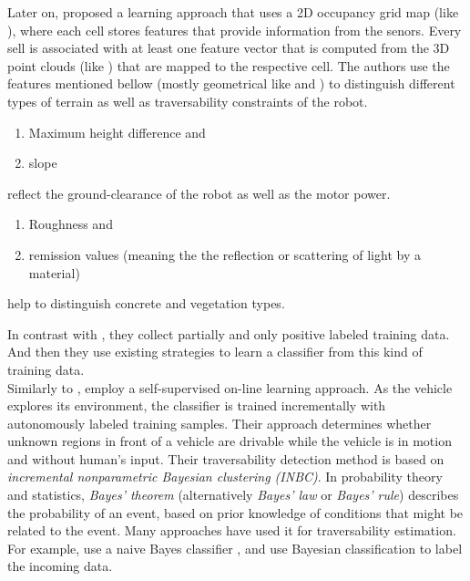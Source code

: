 \documentclass[12pt,a4paper]{report}
\newcommand{\term}{\textit}
\newcommand{\acronym}{\MakeUppercase}
\begin{document}
	Later on, \citet{Suger} proposed a learning approach that uses a \acronym{2d} 
	occupancy grid map (like \citet{Shneier}), where each cell stores features that 
	provide information from the senors. Every sell is associated with at least one 
	feature vector that is computed from the \acronym{3d} point clouds (like 
	\citet{Lalonde}) that are mapped to the respective cell. The authors use the 
	features mentioned bellow (mostly geometrical like \citet{Lalonde} and 
	\citet{Pfaff}) to distinguish different types of terrain as well as 
	traversability constraints of the robot. 
	\begin{enumerate}
		\item Maximum height difference and
		\item slope 
	\end{enumerate}
	reflect the ground-clearance of the robot as well as the motor power.
	\begin{enumerate}
		\item Roughness and
		\item remission values (meaning the the reflection or scattering 
		of light by a material) 
	\end{enumerate}
	help to distinguish concrete and vegetation types.
	\par
	In contrast with \citet{Kim}, they collect partially and only positive labeled 
	training data. And then they use existing strategies \citep{Denis, Elkan} to 
	learn a classifier from this kind of training data.
	\\
	
	Similarly to \citet{Kim}, \citet{Lee} employ a self-supervised on-line learning 
	approach. As the vehicle explores its environment, the classifier is trained 
	incrementally with autonomously labeled training samples. Their approach 
	determines whether unknown regions in front of a vehicle are drivable while the 
	vehicle is in motion and without human’s input. Their traversability detection 
	method is based on \term{incremental nonparametric Bayesian clustering 
	(\acronym{inbc})}. In probability theory and statistics, \term{Bayes' theorem} 
	(alternatively \term{Bayes' law} or \term{Bayes' rule}) describes the probability 
	of an event, based on prior knowledge of conditions that might be related to the 
	event. Many approaches have used it for traversability estimation. For example, 
	\citet{Suger} use a naive Bayes classifier \citep{Denis}, and \citet{Lalonde} use 
	Bayesian classification to label the incoming data.
	\\
	
\end{document}
